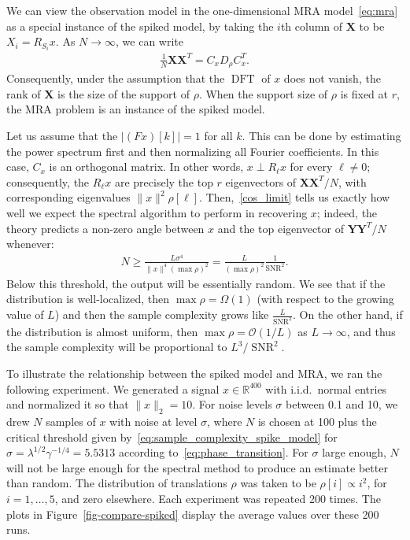 \documentclass{IEEEtran}
\numberwithin{equation}{section}
\numberwithin{figure}{section}
\theoremstyle{plain}
\theoremstyle{definition}
\theoremstyle{remark}
\theoremstyle{plain}
\theoremstyle{remark}
\theoremstyle{plain}
\theoremstyle{plain}
\theoremstyle{remark}
\newcommand{\F}{F}
\newcommand{\DFT}{\operatorname{DFT}}
\newcommand{\SNR}{\operatorname{SNR}}
\newcommand{\Y}{\mathbf{Y}}
\newcommand{\X}{\mathbf{X}}
\begin{document}
We can view the observation model in the one-dimensional MRA model~\eqref{eq:mra} as a special instance of the spiked model, by taking the $i$th column of $\X$ to be $X_i = R_{S_i} x$. As $N\to\infty$, we can write 
%
\begin{align} \label{eq:spike_model_second_moment}
%
\frac{1}{N} \X \X^T = C_x D_{{\rho}} C_x^T.
%
\end{align}
%
Consequently, under the assumption that the $\DFT$ of $x$ does not vanish, the rank of $\X$ is the size of the support of ${\rho}$. When the support size of $\rho$ is fixed at $r$, the MRA problem is an instance of the spiked model.

Let us assume that the $\vert (\F x)[k]\vert =1$ for all $k$. This can be done by estimating the power spectrum first and then normalizing all Fourier coefficients. In this case, $C_x$ is an orthogonal matrix. In other words, 
 $x \perp R_\ell x$ for every $\ell \ne 0$; consequently, the $R_\ell x$ are precisely the top $r$ eigenvectors of $\X \X^T / N$, with corresponding eigenvalues $\|x\|^2 \rho[\ell]$. Then,~\eqref{cos_limit} tells us exactly how well we expect the spectral algorithm to perform in recovering $x$; indeed, the theory predicts a non-zero angle between $x$ and the top eigenvector of $\Y \Y^T / N$ whenever:
%
\begin{align} \label{eq:sample_complexity_spike_model}
%
N \ge \frac{L \sigma^4}{\|x\|^4 (\max\rho)^2} = \frac{L }{ (\max\rho)^2}\frac{1}{\SNR^2}.
%
\end{align}
%
Below this threshold, the output will be essentially random. We see that if the distribution is well-localized, then $\max\rho = \Omega(1)$ (with respect to the growing value of $L$) and then the sample complexity grows like $\frac{L}{\SNR^2}$. On the other hand, if the distribution is almost uniform, then $\max\rho= \mathcal{O}(1/L)$ as $L \to \infty$, and thus the sample complexity will be proportional to $L^3/\SNR^2$. 

To illustrate the relationship between the spiked model and MRA, we ran the following experiment. We generated a signal $x\in\mathbb{R}^{400}$ with i.i.d.\ normal entries and normalized it so that $\|x\|_2=10$. For noise levels $\sigma$ between 0.1 and 10, we drew $N$ samples of $x$ with noise at level $\sigma$, where $N$ is chosen at 100 plus the critical threshold given by~\eqref{eq:sample_complexity_spike_model} for $\sigma = \lambda^{1/2}\gamma^{-1/4}= 5.5313$ according to~\eqref{eq:phase_transition}. For $\sigma$ large enough, $N$ will not be large enough for the spectral method to produce an estimate better than random. The distribution of translations $\rho$ was taken to be $\rho[i] \propto i^2 $, for $i=1,\dots,5$, and zero elsewhere. 
Each experiment was repeated 200 times. The plots in Figure~\ref{fig-compare-spiked} display the average values over these 200 runs.
\end{document}
